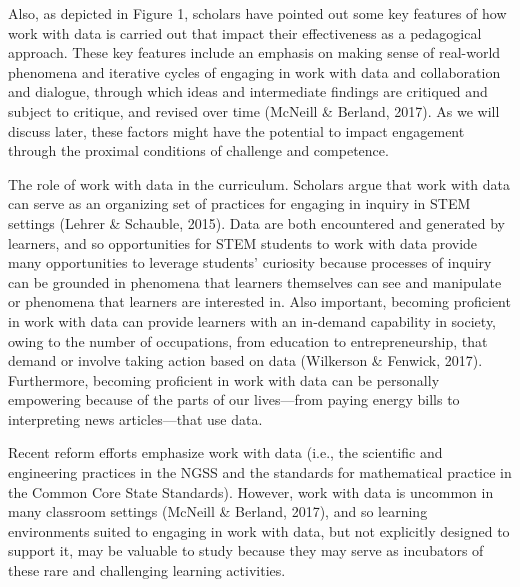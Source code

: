 \documentclass[]{msu-thesis}
\theoremstyle{definition}
\theoremstyle{definition}
\theoremstyle{definition}
\theoremstyle{remark}
\begin{document}
Also, as depicted in Figure 1, scholars have pointed out some key
features of how work with data is carried out that impact their
effectiveness as a pedagogical approach. These key features include an
emphasis on making sense of real-world phenomena and iterative cycles of
engaging in work with data and collaboration and dialogue, through which
ideas and intermediate findings are critiqued and subject to critique,
and revised over time (McNeill \& Berland, 2017). As we will discuss
later, these factors might have the potential to impact engagement
through the proximal conditions of challenge and competence.

The role of work with data in the curriculum. Scholars argue that work
with data can serve as an organizing set of practices for engaging in
inquiry in STEM settings (Lehrer \& Schauble, 2015). Data are both
encountered and generated by learners, and so opportunities for STEM
students to work with data provide many opportunities to leverage
students' curiosity because processes of inquiry can be grounded in
phenomena that learners themselves can see and manipulate or phenomena
that learners are interested in. Also important, becoming proficient in
work with data can provide learners with an in-demand capability in
society, owing to the number of occupations, from education to
entrepreneurship, that demand or involve taking action based on data
(Wilkerson \& Fenwick, 2017). Furthermore, becoming proficient in work
with data can be personally empowering because of the parts of our
lives---from paying energy bills to interpreting news articles---that
use data.

Recent reform efforts emphasize work with data (i.e., the scientific and
engineering practices in the NGSS and the standards for mathematical
practice in the Common Core State Standards). However, work with data is
uncommon in many classroom settings (McNeill \& Berland, 2017), and so
learning environments suited to engaging in work with data, but not
explicitly designed to support it, may be valuable to study because they
may serve as incubators of these rare and challenging learning
activities.
\end{document}
